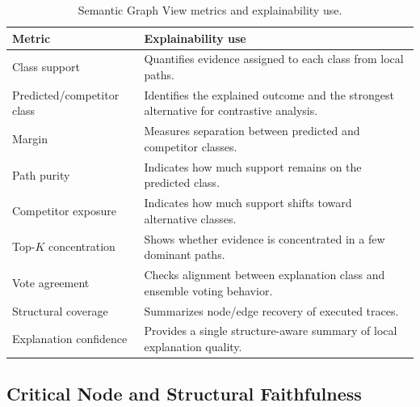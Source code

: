 \documentclass[runningheads]{llncs}
\begin{document}
\begin{table}[t]
\centering
\small
\caption{Semantic Graph View metrics and explainability use.}
\label{tab:semantic-metrics}
\setlength{\tabcolsep}{5pt}
\begin{tabular}{p{3.4cm} p{8.1cm}}
\toprule
Metric & Explainability use \\
\midrule
Class support & Quantifies evidence assigned to each class from local paths. \\
\addlinespace[1pt]
Predicted/competitor class & Identifies the explained outcome and the strongest alternative for contrastive analysis. \\
\addlinespace[1pt]
Margin & Measures separation between predicted and competitor classes. \\
\addlinespace[1pt]
Path purity & Indicates how much support remains on the predicted class. \\
\addlinespace[1pt]
Competitor exposure & Indicates how much support shifts toward alternative classes. \\
\addlinespace[1pt]
Top-$K$ concentration & Shows whether evidence is concentrated in a few dominant paths. \\
\addlinespace[1pt]
Vote agreement & Checks alignment between explanation class and ensemble voting behavior. \\
\addlinespace[1pt]
Structural coverage & Summarizes node/edge recovery of executed traces. \\
\addlinespace[1pt]
Explanation confidence & Provides a single structure-aware summary of local explanation quality. \\
\bottomrule
\end{tabular}
\end{table}

\subsection{Critical Node and Structural Faithfulness}
\label{sec:structural-faithfulness}
\end{document}
